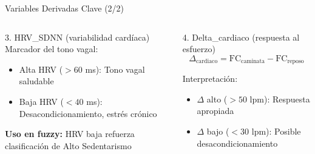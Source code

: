 \documentclass[aspectratio=169]{beamer}
\begin{document}
\begin{frame}{Variables Derivadas Clave (2/2)}

\begin{columns}[T]
\begin{block}{3. HRV\_SDNN (variabilidad cardíaca)}
Marcador del tono vagal:
\begin{itemize}
    \item Alta HRV ($>60$ ms): Tono vagal saludable
    \item Baja HRV ($<40$ ms): Desacondicionamiento, estrés crónico
\end{itemize}

\vspace{0.2cm}

\textbf{Uso en fuzzy:} HRV baja refuerza clasificación de Alto Sedentarismo
\end{block}

\begin{block}{4. Delta\_cardiaco (respuesta al esfuerzo)}
\begin{equation*}
\Delta_{\text{cardiaco}} = \text{FC}_{\text{caminata}} - \text{FC}_{\text{reposo}}
\end{equation*}

\vspace{0.2cm}

Interpretación:
\begin{itemize}
    \item $\Delta$ alto ($>50$ lpm): Respuesta apropiada
    \item $\Delta$ bajo ($<30$ lpm): Posible desacondicionamiento
\end{itemize}
\end{block}
\end{columns}

\end{frame}

\end{document}

